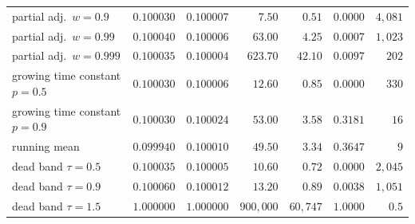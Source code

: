 \begin{table}[!ht]
\begin{tabular}{@{}lrrrrrr@{}}
partial adj.\ $w = 0.9$       & $0.100030$ & $0.100007$ & $7.50$        & $0.51$     & $0.0000$ & $4{,}081$ \\
partial adj.\ $w = 0.99$      & $0.100040$ & $0.100006$ & $63.00$       & $4.25$     & $0.0007$ & $1{,}023$ \\
partial adj.\ $w = 0.999$     & $0.100035$ & $\mathbf{0.100004}$ & $623.70$      & $42.10$    & $0.0097$ & $202$ \\
growing time constant $p=0.5$ & $0.100030$ & $0.100006$ & $12.60$       & $0.85$     & $0.0000$ & $330$ \\
growing time constant $p=0.9$ & $0.100030$ & $0.100024$ & $53.00$       & $3.58$     & $0.3181$ & $16$ \\
running mean                  & $0.099940$ & $0.100010$ & $49.50$       & $3.34$     & $0.3647$ & $9$ \\
dead band $\tau = 0.5$        & $0.100035$ & $0.100005$ & $10.60$       & $0.72$     & $0.0000$ & $2{,}045$ \\
dead band $\tau = 0.9$        & $0.100060$ & $0.100012$ & $13.20$       & $0.89$     & $0.0038$ & $1{,}051$ \\
dead band $\tau = 1.5$        & $\mathbf{1.000000}$ & $\mathbf{1.000000}$ & $900{,}000$ & $60{,}747$ & $1.0000$ & $0.5$ \\
\bottomrule
\end{tabular}
\end{table}

